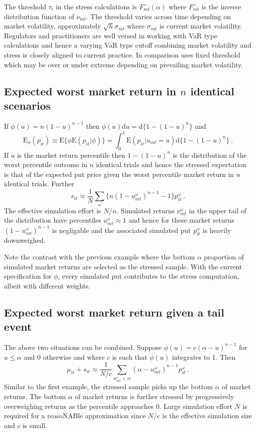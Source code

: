 \documentclass[12pt]{article}
\newcommand{\E}{\mathrm{E}}
\renewcommand{\o}{\omega}
\newcommand{\Es}{\E_\phi}
\newcommand{\de}{\mathrm{d}}
\begin{document}
The threshold $\tau_t$ in the stress calculations is $F_{mt}^-(\alpha)$ where $F_{mt}^-$ is the inverse distribution function of $\nu_{mt}$. The threshold varies across time depending on market volatility, approximately $\sqrt{h}\sigma_{mt}$ where $\sigma_{mt}$ is current market volatility.   Regulators and practitioners  are well versed in working with VaR type calculations and hence a varying VaR type cutoff combining market volatility and stress is closely aligned to current practice. In comparison \cite{brownlees2015} uses fixed threshold which may be over or under extreme depending on prevailing market volatility.


\subsection{Expected worst market return in $n$ identical scenarios}

If $\phi(u)=n(1-u)^{n-1}$ then $\phi(u)\de u = \de\{1-(1-u)^n\}$ and
$$
\Es(p_{it}) \equiv \E\{\phi\E(p_{it}|\phi)\} = \int_0^1\E(p_{it}|u_{mt}=u)\de\{1-(1-u)^n\}\ .
$$
If $u$ is the market return percentile then  $1-(1-u)^n$ is the distribution of the worst percentile outcome in $n$ identical trials and hence the stressed expectation is that of the expected put price given the worst percentile market return in $n$ identical trials.  Further
$$
s_{it}  \approx  \frac{1}{N} \sum_\o \{ n(1-u^\o_{mt})^{n-1}-1\}p_{it}^\o \ .
$$
The effective simulation effort is $N/n$.
Simulated returns $\nu^\o_{mt}$ in the upper tail of the distribution  have percentiles $u^\o_{mt}\approx 1$ and hence for these market returns $(1-u^\o_{mt})^{n-1}$ is negligable and the associated simulated put $p_{it}^\omega$ is heavily downweighed.

Note the contrast with the previous example where the bottom $\alpha$ proportion of simulated market returns are selected as the stressed sample. With the current specification for $\phi$,   every simulated put contributes to the stress computation, albeit with  different weights.


\subsection{Expected worst market return given a tail event}

The above two situations can be combined.   Suppose  $\phi(u)=c(\alpha-u)^{n-1}$ for $u\le \alpha$ and 0 otherwise and where $c$ is such that $\phi(u)$ integrates to 1. Then
$$
\mu_{it}+s_{it} \approx \frac{1}{N/c}\sum_{u^\o_{mt}<\alpha}  \left(\alpha-u^\o_{mt}\right)^{n-1}p_{it}^\o\ .
$$
Similar to the first example, the stressed sample picks up the bottom $\alpha$ of market returns. The bottom $\alpha$ of market returns is further stressed by  progressively overweighing returns as the percentile approaches 0.   Large simulation effort $N$ is required for a reasoNABle approximation since $N/c$ is the effective simulation size and $c$ is small.
\end{document}
